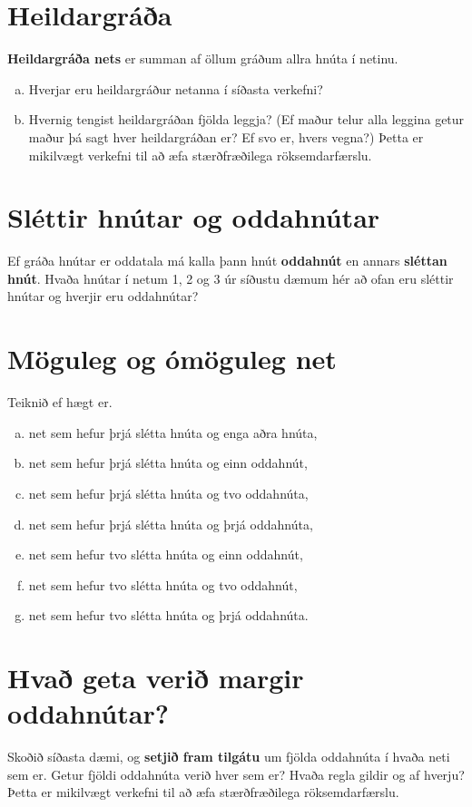 \documentclass[b5paper,12pt]{book}
\begin{document}
\section{Heildargráða}
\textbf{Heildargráða nets} er summan af öllum gráðum allra hnúta í netinu.
\begin{enumerate}[(a)]
\item Hverjar eru heildargráður netanna í síðasta verkefni?
\item Hvernig tengist heildargráðan fjölda leggja? (Ef maður telur alla leggina getur maður þá sagt hver heildargráðan er? Ef svo er, hvers vegna?) Þetta er mikilvægt verkefni til að æfa stærðfræðilega röksemdarfærslu.
\end{enumerate}

\section{Sléttir hnútar og oddahnútar}
Ef gráða hnútar er oddatala má kalla þann hnút \textbf{oddahnút} en annars \textbf{sléttan hnút}.
Hvaða hnútar í netum 1, 2 og 3 úr síðustu dæmum hér að ofan eru sléttir hnútar og hverjir eru oddahnútar? 

\section{Möguleg og ómöguleg net}
Teiknið ef hægt er.
\begin{enumerate}[(a)]
\item net sem hefur þrjá slétta hnúta og enga aðra hnúta,
\item net sem hefur þrjá slétta hnúta og einn oddahnút,
\item net sem hefur þrjá slétta hnúta og tvo oddahnúta,
\item net sem hefur þrjá slétta hnúta og þrjá oddahnúta,
\item net sem hefur tvo slétta hnúta og einn oddahnút,
\item net sem hefur tvo slétta hnúta og tvo oddahnút,
\item net sem hefur tvo slétta hnúta og þrjá oddahnúta.
\end{enumerate}

\section{Hvað geta verið margir oddahnútar?}
Skoðið síðasta dæmi, og \textbf{setjið fram tilgátu} um fjölda oddahnúta í hvaða neti sem er.  Getur fjöldi oddahnúta verið hver sem er? Hvaða regla gildir og af hverju? Þetta er mikilvægt verkefni til að æfa stærðfræðilega röksemdarfærslu.
\end{document}
